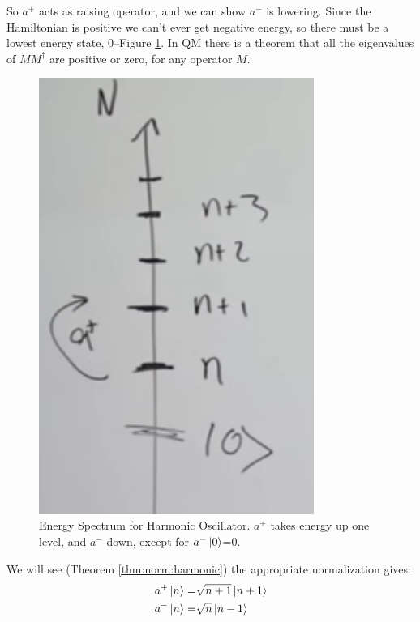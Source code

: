 \documentclass[]{article}
\begin{document}
So $a^+$ acts as raising operator, and we can show $a^-$ is lowering.  Since the Hamiltonian is positive we can't ever get negative energy, so there must be a lowest energy state, $0$--Figure \ref{fig:aqm-3-spectrum}. In QM there is a theorem that all the eigenvalues of $MM^\dagger$ are positive or zero, for any operator $M$. 

\begin{figure}[H]
	\begin{center}
		\caption[Energy Spectrum for Harmonic Oscillator]{Energy Spectrum for Harmonic Oscillator. $a^+$ takes energy up one level, and $a^-$ down, except for $a^-\ket{0}$=0.}\label{fig:aqm-3-spectrum}
		\includegraphics[width=0.8\textwidth]{aqm-3-spectrum}
	\end{center}
\end{figure}
We will see (Theorem \ref{thm:norm:harmonic}) the appropriate normalization gives:
\begin{align*}
	a^+\ket{n} =& \sqrt{n+1}\ket{n+1}\\
	a^-\ket{n} =& \sqrt{n}\ket{n-1}
\end{align*}
 
\end{document}
